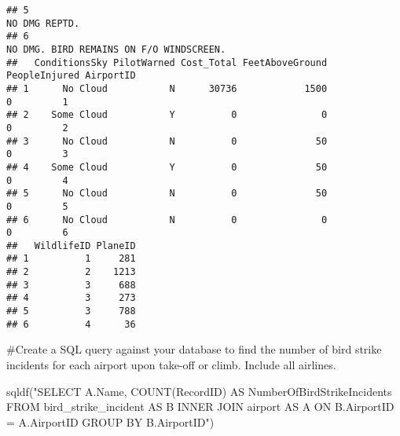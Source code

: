 \documentclass[
]{article}
\newenvironment{Shaded}{\begin{snugshade}}{\end{snugshade}}
\newcommand{\FunctionTok}[1]{\textcolor[rgb]{0.00,0.00,0.00}{#1}}
\newcommand{\NormalTok}[1]{#1}
\newcommand{\StringTok}[1]{\textcolor[rgb]{0.31,0.60,0.02}{#1}}
\begin{document}
\begin{verbatim}
## 5                                                                                                                                                                                                                                                   NO DMG REPTD.
## 6                                                                                                                                                                                                                         NO DMG. BIRD REMAINS ON F/O WINDSCREEN.
##   ConditionsSky PilotWarned Cost_Total FeetAboveGround PeopleInjured AirportID
## 1      No Cloud           N      30736            1500             0         1
## 2    Some Cloud           Y          0               0             0         2
## 3      No Cloud           N          0              50             0         3
## 4    Some Cloud           Y          0              50             0         4
## 5      No Cloud           N          0              50             0         5
## 6      No Cloud           N          0               0             0         6
##   WildlifeID PlaneID
## 1          1     281
## 2          2    1213
## 3          3     688
## 4          3     273
## 5          3     788
## 6          4      36
\end{verbatim}

\#Create a SQL query against your database to find the number of bird
strike incidents for each airport upon take-off or climb. Include all
airlines.

\begin{Shaded}
\begin{Highlighting}[]
\FunctionTok{sqldf}\NormalTok{(}\StringTok{"SELECT A.Name, COUNT(RecordID) AS NumberOfBirdStrikeIncidents FROM bird\_strike\_incident AS B INNER JOIN airport AS A ON B.AirportID = A.AirportID}
\StringTok{          GROUP BY B.AirportID"}\NormalTok{)}
\end{Highlighting}
\end{Shaded}
\end{document}
